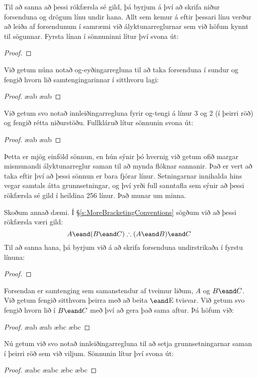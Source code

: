 Til að sanna að þessi rökfærsla sé gild, þá byrjum á því að skrifa niður forsenduna og drögum línu undir hana. Allt sem kemur á eftir þessari línu verður að leiða af forsendunum í samræmi við ályktunarreglurnar sem við höfum kynnt til sögunnar. Fyrsta línan í sönnuninni lítur því svona út:

\begin{proof}
\end{proof}
Við getum núna notað og-eyðingarregluna til að taka forsenduna í sundur og fengið hvorn lið samtengingarinnar í sitthvoru lagi:
\begin{proof}
	 \ae{ab}
	 \ae{ab}
\end{proof}

Við getum svo notað innleiðingarregluna fyrir og-tengi á línur 3 og 2 (í þeirri röð) og fengið rétta niðurstöðu. Fullkláruð lítur sönnunin svona út:

\begin{proof}

	 \ae{ab}
	 \ae{ab}
	 
\end{proof}
Þetta er mjög einföld sönnun, en hún sýnir þó hvernig við getum ofið margar mismunandi ályktunarreglur saman til að mynda flóknar sannanir. Það er vert að taka eftir því að þessi sönnun er bara fjórar línur. Setningarnar innihalda hins vegar samtals átta grunnsetningar, og því yrði full sanntafla sem sýnir að þessi rökfærsla sé gild í heildina 256 línur. Það munar um minna.

Skoðum annað dæmi. Í \S\ref{s:MoreBracketingConventions} sögðum við að þessi rökfærsla væri gild:
$$A \eand (B \eand C) \therefore (A \eand B) \eand C$$
Til að sanna hana, þá byrjum við á að skrifa forsenduna undirstrikaða í fyrstu línuna:

\begin{proof}
\end{proof}
Forsendan er samtenging sem samanstendur af tveimur liðum, $A$ og $B \eand C$. Við getum fengið sitthvorn þeirra með að beita $\eand$E tvisvar. Við getum svo fengið hvorn lið í $B \eand C$ með því að gera það sama aftur. Þá höfum við:
\begin{proof}
	 \ae{ab}
	 \ae{ab}
	 \ae{bc}
	 \ae{bc}
\end{proof}
Nú getum við svo notað innleiðingarregluna til að setja grunnsetningarnar saman í þeirri röð sem við viljum. Sönnunin lítur því svona út:
\begin{proof}
	 \ae{abc}
	 \ae{abc}
	 \ae{bc}
	 \ae{bc}
\end{proof}

